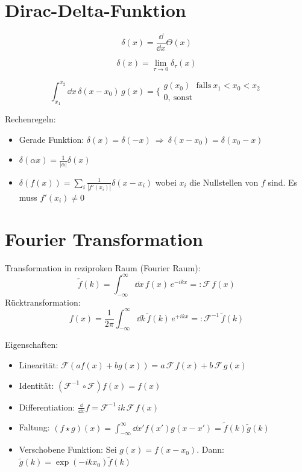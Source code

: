 \section{Dirac-Delta-Funktion}

\begin{frameddefn}
	\[\delta(x) = \frac{\dd}{\dd x}\Theta(x)\]
\end{frameddefn}

\begin{frameddefn}
	\[
	\delta(x) = \lim\limits_{\tau \to 0} \delta_{\tau}(x)
	\]
\end{frameddefn}

\begin{frameddefn}
	\[
	\int_{x_1}^{x_2} \dd x\, \delta(x-x_0)\, g(x) = \biggl\{\begin{array}{ll}
		g(x_0) \ \ \ \textrm{falls}\  x_1 < x_0 < x_2 \\
		0, \  \textrm{sonst}
	\end{array}
	\]
\end{frameddefn}

Rechenregeln:
\begin{itemize}
	\item Gerade Funktion: $\delta(x) = \delta(-x) \ \Rightarrow \ \delta(x-x_0) = \delta(x_0 - x)$
	\item $\delta(\alpha x) = \frac{1}{|\alpha|} \delta(x)$
	\item $\delta(f(x)) = \sum_{i} \frac{1}{|f'(x_i)|} \delta(x-x_i)$ wobei $x_i$ die Nullstellen von $f$ sind. Es muss $f'(x_i) \neq 0$
\end{itemize}

\section{Fourier Transformation}

\begin{framedprop}
	Transformation in reziproken Raum (Fourier Raum):
	\[
	\tilde{f}(k) = \int_{-\infty}^{\infty} \dd x\, f(x)\, e^{-ikx} =: \mathcal{F}\, f(x)
	\]
	Rücktransformation:
	\[
	f(x) = \frac{1}{2\pi} \int_{-\infty}^{\infty} \dd k\, \tilde{f}(k)\, e^{+ikx} =: \mathcal{F}^{-1}\, \tilde{f}(k)
 	\]
\end{framedprop}

Eigenschaften:
\begin{itemize}
	\item Linearität: $\mathcal{F}(a f(x) + b g(x)) = a\, \mathcal{F}\, f(x) + b\, \mathcal{F}\, g(x)$
	\item Identität: $(\mathcal{F}^{-1}\,\circ \mathcal{F}) f(x) = f(x)$
	\item Differentiation: $\frac{\dd}{\dd x}f = \mathcal{F}^{-1}\, ik\, \mathcal{F}\, f(x)$
	\item Faltung: $(f \star g)(x) = \int_{-\infty}^{\infty} \dd x' f(x') g(x - x') = \tilde{f}(k)\tilde{g}(k)$
	\item Verschobene Funktion: Sei $g(x) = f(x-x_0)$. Dann: $\tilde{g}(k) = \exp(-ikx_0)\tilde{f}(k)$
\end{itemize}

